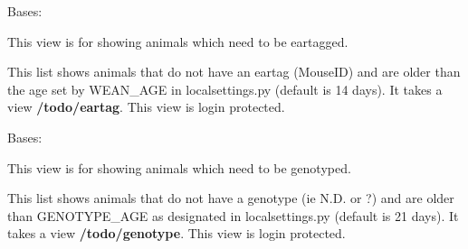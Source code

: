 \documentclass[letterpaper,10pt,english]{sphinxmanual}
\begin{document}

\begin{fulllineitems}
\label{api:mousedb.animal.views.EarTagList}
Bases: {\hyperref[api:mousedb.animal.views.AnimalList]{}}

This view is for showing animals which need to be eartagged.

This list shows animals that do not have an eartag (MouseID) and are older than the age set by WEAN\_AGE in localsettings.py (default is 14 days).
It takes a view \textbf{/todo/eartag}.
This view is login protected.

\begin{fulllineitems}
\label{api:mousedb.animal.views.EarTagList.queryset}
\end{fulllineitems}


\end{fulllineitems}


\begin{fulllineitems}
\label{api:mousedb.animal.views.GenotypeList}
Bases: {\hyperref[api:mousedb.animal.views.AnimalList]{}}

This view is for showing animals which need to be genotyped.

This list shows animals that do not have a genotype (ie N.D. or ?) and are older than GENOTYPE\_AGE as designated in localsettings.py (default is 21 days).
It takes a view \textbf{/todo/genotype}.
This view is login protected.

\begin{fulllineitems}
\label{api:mousedb.animal.views.GenotypeList.queryset}
\end{fulllineitems}


\end{fulllineitems}

\end{document}
